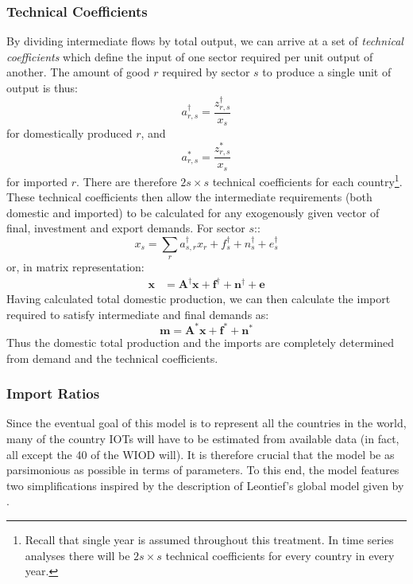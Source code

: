 \documentclass[a4paper]{article}
\begin{document}
\subsubsection*{Technical Coefficients}\label{sec:techcoeffs}
By dividing intermediate flows by total output, we can arrive at a set of \textit{technical coefficients} which define the input of one sector required per unit output of another.
The amount of good $r$ required by sector $s$ to produce a single unit of output is thus:
\begin{equation}\label{eq:adagger}
a_{r,s}^\dagger = \frac{z^\dagger_{r,s}}{x_s}
\end{equation}
for domestically produced $r$, and
\begin{equation}\label{eq:astar}
a_{r,s}^* = \frac{z^*_{r,s}}{x_s}
\end{equation}
for imported $r$. There are therefore $2s \times s$ technical coefficients for each country\footnote{Recall that single year is assumed throughout this treatment.
In time series analyses there will be $2s \times s$ technical coefficients for every country in every year.}.
These technical coefficients then allow the intermediate requirements (both domestic and imported) to be calculated for any exogenously given vector of final, investment and export demands. For sector $s$::
$$
x_s = \sum_r{a^\dagger_{s,r}x_r} + f^\dagger_s + n^\dagger_s + e^\dagger_s 
$$
or, in matrix representation:
\begin{align}
\boldsymbol{x}& = 
\boldsymbol{A^\dagger}\boldsymbol{x}
+ 
\boldsymbol{f^\dagger} + \boldsymbol{n^\dagger} + \boldsymbol{e} 
\label{eqn:xIRIO}
\end{align}
Having calculated total domestic production, we can then calculate the import required to satisfy intermediate and final demands as:
\begin{equation}\label{eqn:mIRIO}
\boldsymbol{m}
=
\boldsymbol{A^*}\boldsymbol{x}
+
\boldsymbol{f^*} + \boldsymbol{n^*} 
\end{equation}
Thus the domestic total production and the imports are completely determined from demand and the technical coefficients.

\subsubsection*{Import Ratios}\label{sec:importratios}
Since the eventual goal of this model is to represent all the countries in the world, many of the country IOTs will have to be estimated from available data (in fact, all except the 40 of the WIOD will).
It is therefore crucial that the model be as parsimonious as possible in terms of parameters.
To this end, the model features two simplifications inspired by the description of Leontief's global model given by \textcite{Duchin2004}.
\end{document}
